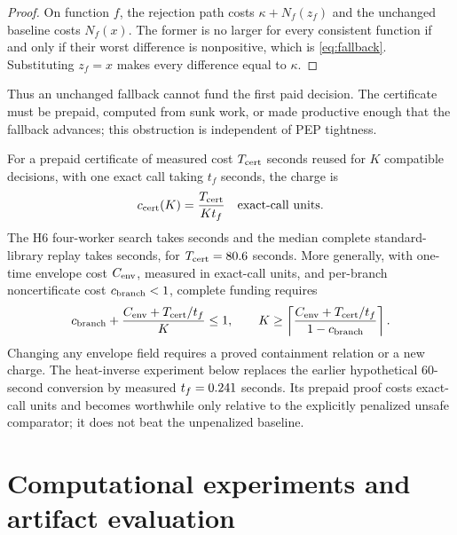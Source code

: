 \documentclass[smallextended]{svjour3}
\begin{document}
\begin{proof}
On function $f$, the rejection path costs $\kappa+N_f(z_f)$ and the unchanged
baseline costs $N_f(x)$.  The former is no larger for every consistent function
if and only if their worst difference is nonpositive, which is
\eqref{eq:fallback}.  Substituting $z_f=x$ makes every difference equal to
$\kappa$.
\end{proof}

Thus an unchanged fallback cannot fund the first paid decision.  The
certificate must be prepaid, computed from sunk work, or made productive enough
that the fallback advances; this obstruction is independent of PEP tightness.

For a prepaid certificate of measured cost $T_{\rm cert}$ seconds reused for
$K$ compatible decisions, with one exact call taking $t_f$ seconds, the charge is
\begin{equation}
 c_{\rm cert}(K)=\frac{T_{\rm cert}}{K t_f}
 \quad\text{exact-call units}.                         \label{eq:cost-amortization}
\end{equation}
The H6 four-worker search takes \HsixCertificateSearchSeconds{} seconds and the
median complete standard-library replay takes
\HsixCertificateVerifySeconds{} seconds, for
$T_{\rm cert}=80.6{}$ seconds.  More generally, with
one-time envelope cost $C_{\rm env}$, measured in exact-call units, and per-branch
noncertificate cost $c_{\rm branch}<1$, complete funding requires
\begin{equation}
 c_{\rm branch}+\frac{C_{\rm env}+T_{\rm cert}/t_f}{K}\leq1,
 \qquad
 K\geq\left\lceil
 \frac{C_{\rm env}+T_{\rm cert}/t_f}{1-c_{\rm branch}}
 \right\rceil.                                       \label{eq:full-envelope-cost}
\end{equation}
Changing any envelope field requires a proved containment relation or a new
charge.  The heat-inverse experiment below replaces the earlier hypothetical
60-second conversion by measured $t_f=0.241{}$ seconds.  Its
prepaid proof costs \HeatCertificateUnits{} exact-call units and becomes
worthwhile only relative to the explicitly penalized unsafe comparator; it
does not beat the unpenalized baseline.

\section{Computational experiments and artifact evaluation}
\label{sec:numerics}
\end{document}
